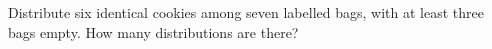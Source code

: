 Distribute six identical cookies among seven labelled bags, with at least three bags empty. How many distributions are there?
